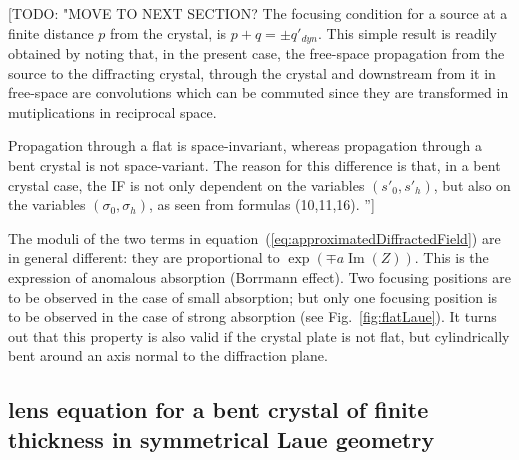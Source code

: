 \documentclass[preprint]{iucr}              %
\newcommand{\todo}[1]{{\color{red}[TODO: "#1'']}}
\begin{document}

\todo{MOVE TO NEXT SECTION?
The focusing condition for a source at a finite distance $p$ from the crystal, is $p+q=\pm q'_{dyn}$.
This simple result is readily obtained by noting that, in the present case, the free-space propagation from the source to the diffracting crystal, through the crystal and downstream from it in free-space are convolutions which can be commuted since they are transformed in mutiplications in reciprocal space.

Propagation through a flat is space-invariant, whereas propagation through a bent crystal is not space-variant. The reason for this difference is that, in a bent crystal case, the IF is not only dependent on the variables $(s'_0,s'_h)$, but also on the variables $(\sigma_0,\sigma_h)$, as seen from formulas (10,11,16).
}

The moduli of the two terms in equation~(\ref{eq:approximatedDiffractedField}) are in general different: they are proportional to $\exp(\mp a \operatorname{Im}(Z))$. This is the expression of anomalous absorption (Borrmann effect). Two focusing positions are to be observed in the case of small absorption; but only one focusing position is to be observed in the case of strong absorption (see Fig.~\ref{fig:flatLaue}). It turns out that this property is also valid if the crystal plate is not flat, but cylindrically bent around an axis normal to the diffraction plane. 



\subsection{lens equation for a bent crystal of finite thickness in symmetrical Laue geometry}
\label{sec:LaueNewCLE}

\end{document}
